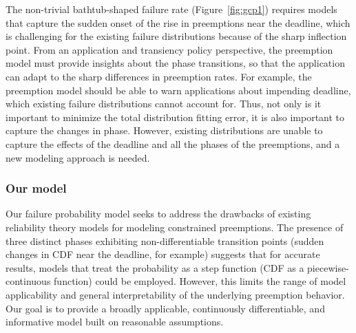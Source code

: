 



The non-trivial bathtub-shaped failure rate (Figure~\ref{fig:gcp1}) requires models that capture the sudden onset of the rise in preemptions near the deadline, which is challenging for the existing failure distributions because of the sharp inflection point. 
From an application and transiency policy perspective, the preemption model must provide insights about the phase transitions, so that the application can adapt to the sharp differences in preemption rates.
%
For example, the preemption model should be able to warn applications about impending deadline, which existing failure distributions cannot account for. 
Thus, not only is it important to minimize the total distribution fitting error, it is also important to capture the changes in phase.
%
However,
existing distributions are unable to capture the effects of the deadline and all the phases of the preemptions, and a new modeling approach is needed. 

\vspace*{\subsecspace}
\subsubsection{Our  model}
\label{subsec:preemption-model}



Our failure probability model seeks to address the drawbacks of existing reliability theory models for modeling constrained preemptions. 
The presence of three distinct phases exhibiting non-differentiable transition points (sudden changes in CDF near the deadline, for example) suggests that for accurate results, models that treat the probability as a step function (CDF as a piecewise-continuous function) could be employed.
However, this limits the range of model applicability and general interpretability of the underlying preemption behavior. Our goal is to provide a broadly applicable, continuously differentiable, and informative model built on reasonable assumptions.  


